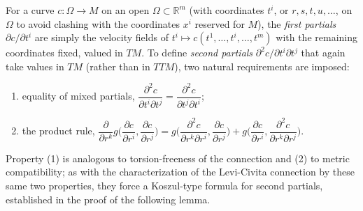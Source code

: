 For a curve $c:\Omega\to M$ on an open $\Omega\subset\mathbb R^m$ (with
coordinates $t^i$, or $r,s,t,u,\dots$, on $\Omega$ to avoid clashing with the
coordinates $x^i$ reserved for $M$), the \emph{first partials} $\partial c/\partial t^i$
are simply the velocity fields of $t^i\mapsto c(t^1,\dots,t^i,\dots,t^m)$ with the
remaining coordinates fixed, valued in $TM$. To define \emph{second partials}
$\partial^2c/\partial t^i\partial t^j$ that again take values in $TM$ (rather than
in $TTM$), two natural requirements are imposed:
\begin{enumerate}
\item[(1)] equality of mixed partials,
$\dfrac{\partial^2c}{\partial t^i\partial t^j}=\dfrac{\partial^2c}{\partial t^j\partial t^i}$;
\item[(2)] the product rule,
$\dfrac{\partial}{\partial r^k}g\Big(\dfrac{\partial c}{\partial r^i},\dfrac{\partial c}{\partial r^j}\Big)
=g\Big(\dfrac{\partial^2c}{\partial r^k\partial r^i},\dfrac{\partial c}{\partial r^j}\Big)
+g\Big(\dfrac{\partial c}{\partial r^i},\dfrac{\partial^2c}{\partial r^k\partial r^j}\Big)$.
\end{enumerate}
Property (1) is analogous to torsion-freeness of the connection and (2) to
metric compatibility; as with the characterization of the Levi-Civita connection
by these same two properties, they force a Koszul-type formula for second
partials, established in the proof of the following lemma.


